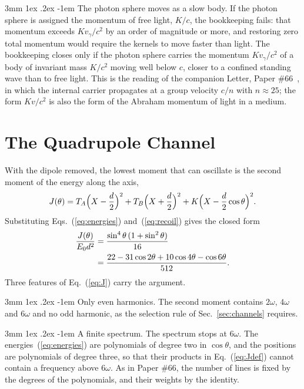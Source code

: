 \documentclass[%
 reprint, amsmath,amssymb, aps, prb, ]{revtex4-2}
\makeatletter
\numberwithin{equation}{section}
\renewcommand\paragraph{%
  \@startsection{paragraph}{4}{\z@}%
    {3mm \@plus 1ex \@minus .2ex}%
    {-1em}%
    {\normalfont\normalsize\itshape}}
\makeatother
\begin{document}
\paragraph{The photon sphere moves as a slow body.} If the photon sphere is assigned the momentum of free light, $K/c$, the bookkeeping fails: that momentum exceeds $Kv_\gamma/c^2$ by an order of magnitude or more, and restoring zero total momentum would require the kernels to move faster than light. The bookkeeping closes only if the photon sphere carries the momentum $Kv_\gamma/c^2$ of a body of invariant mass $K/c^2$ moving well below $c$, closer to a confined standing wave than to free light. This is the reading of the companion Letter, Paper \#66~\cite{H66}, in which the internal carrier propagates at a group velocity $c/n$ with $n \approx 25$; the form $Kv/c^2$ is also the form of the Abraham momentum of light in a medium.

\section{The Quadrupole Channel}
\label{sec:quadrupole}

With the dipole removed, the lowest moment that can oscillate is the second moment of the energy along the axis,
\begin{equation}
J(\theta) = T_A\Bigl(X - \frac d2\Bigr)^2 + T_B\Bigl(X + \frac d2\Bigr)^2 + K\Bigl(X - \frac d2\cos\theta\Bigr)^2.
\label{eq:Jdef}
\end{equation}
Substituting Eqs.~(\ref{eq:energies}) and~(\ref{eq:recoil}) gives the closed form
\begin{align}
\frac{J(\theta)}{E_0d^2} &= \frac{\sin^4\theta\,(1 + \sin^2\theta)}{16}
\notag\\
&= \frac{22 - 31\cos2\theta + 10\cos4\theta - \cos6\theta}{512}.
\label{eq:J}
\end{align}
Three features of Eq.~(\ref{eq:J}) carry the argument.

\paragraph{Only even harmonics.} The second moment contains $2\omega$, $4\omega$ and $6\omega$ and no odd harmonic, as the selection rule of Sec.~\ref{sec:channels} requires.

\paragraph{A finite spectrum.} The spectrum stops at $6\omega$. The energies~(\ref{eq:energies}) are polynomials of degree two in $\cos\theta$, and the positions are polynomials of degree three, so that their products in Eq.~(\ref{eq:Jdef}) cannot contain a frequency above $6\omega$. As in Paper \#66, the number of lines is fixed by the degrees of the polynomials, and their weights by the identity.
\end{document}
